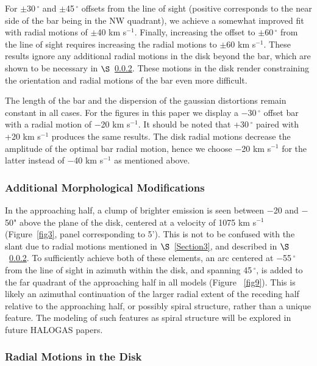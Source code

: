 \documentclass{emulateapj}
\begin{document}
\par
    For $\pm$30$\,^{\circ}$ and $\pm$45$\,^{\circ}$ offsets from the line of sight (positive corresponds to the near side of the bar being in the NW quadrant), we achieve a somewhat improved fit with radial motions of $\pm$40 km s$^{-1}$.  Finally, increasing the offset to $\pm$60$\,^{\circ}$ from the line of sight requires increasing the radial motions to $\pm$60 km s$^{-1}$.  These results ignore any additional radial motions in the disk beyond the bar, which are shown to be necessary in $\S$~\ref{Section4.1.5}.  These motions in the disk render constraining the orientation and radial motions of the bar even more difficult.

\par
     The length of the bar and the dispersion of the gaussian distortions remain constant in all cases.  For the figures in this paper we display a $-$30$\,^{\circ}$ offset bar with a radial motion of $-$20 km s$^{-1}$.  It should be noted that +30$\,^{\circ}$ paired with +20 km s$^{-1}$ produces the same results. The disk radial motions decrease the amplitude of the optimal bar radial motion, hence we choose $-$20 km s$^{-1}$ for the latter instead of $-$40 km s$^{-1}$ as mentioned above.

\subsubsection{Additional Morphological Modifications} \label{Section4.1.4}

\par
     In the approaching half, a clump of brighter emission is seen between $-$20 and $-$50" above the plane of the disk, centered at a velocity of 1075 km s$^{-1}$ (Figure~\ref{fig3}, panel corresponding to 5').  This is not to be confused with the slant due to radial motions mentioned in $\S$~\ref{Section3}, and described in $\S$~\ref{Section4.1.5}.  To sufficiently achieve both of these elements, an arc centered at $-$55$\,^{\circ}$ from the line of sight in azimuth within the disk, and spanning 45$\,^{\circ}$, is added to the far quadrant of the approaching half in all models (Figure ~\ref{fig9}). This is likely an azimuthal continuation of the larger radial extent of the receding half relative to the approaching half, or possibly spiral structure, rather than a unique feature.  The modeling of such features as spiral structure will be explored in future HALOGAS papers.

     
\subsubsection{Radial Motions in the Disk} \label{Section4.1.5}
\end{document}
